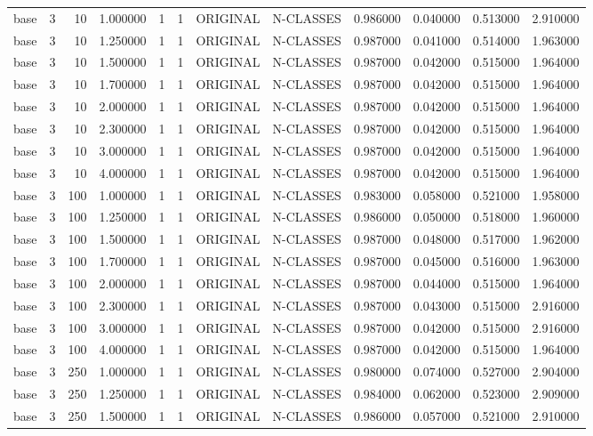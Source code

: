 \begin{tabular}{lrrrllllrrrr}
base & 3 & 10 & 1.000000 & 1 & 1 & ORIGINAL & N-CLASSES & 0.986000 & 0.040000 & 0.513000 & 2.910000 \\
base & 3 & 10 & 1.250000 & 1 & 1 & ORIGINAL & N-CLASSES & 0.987000 & 0.041000 & 0.514000 & 1.963000 \\
base & 3 & 10 & 1.500000 & 1 & 1 & ORIGINAL & N-CLASSES & 0.987000 & 0.042000 & 0.515000 & 1.964000 \\
base & 3 & 10 & 1.700000 & 1 & 1 & ORIGINAL & N-CLASSES & 0.987000 & 0.042000 & 0.515000 & 1.964000 \\
base & 3 & 10 & 2.000000 & 1 & 1 & ORIGINAL & N-CLASSES & 0.987000 & 0.042000 & 0.515000 & 1.964000 \\
base & 3 & 10 & 2.300000 & 1 & 1 & ORIGINAL & N-CLASSES & 0.987000 & 0.042000 & 0.515000 & 1.964000 \\
base & 3 & 10 & 3.000000 & 1 & 1 & ORIGINAL & N-CLASSES & 0.987000 & 0.042000 & 0.515000 & 1.964000 \\
base & 3 & 10 & 4.000000 & 1 & 1 & ORIGINAL & N-CLASSES & 0.987000 & 0.042000 & 0.515000 & 1.964000 \\
base & 3 & 100 & 1.000000 & 1 & 1 & ORIGINAL & N-CLASSES & 0.983000 & 0.058000 & 0.521000 & 1.958000 \\
base & 3 & 100 & 1.250000 & 1 & 1 & ORIGINAL & N-CLASSES & 0.986000 & 0.050000 & 0.518000 & 1.960000 \\
base & 3 & 100 & 1.500000 & 1 & 1 & ORIGINAL & N-CLASSES & 0.987000 & 0.048000 & 0.517000 & 1.962000 \\
base & 3 & 100 & 1.700000 & 1 & 1 & ORIGINAL & N-CLASSES & 0.987000 & 0.045000 & 0.516000 & 1.963000 \\
base & 3 & 100 & 2.000000 & 1 & 1 & ORIGINAL & N-CLASSES & 0.987000 & 0.044000 & 0.515000 & 1.964000 \\
base & 3 & 100 & 2.300000 & 1 & 1 & ORIGINAL & N-CLASSES & 0.987000 & 0.043000 & 0.515000 & 2.916000 \\
base & 3 & 100 & 3.000000 & 1 & 1 & ORIGINAL & N-CLASSES & 0.987000 & 0.042000 & 0.515000 & 2.916000 \\
base & 3 & 100 & 4.000000 & 1 & 1 & ORIGINAL & N-CLASSES & 0.987000 & 0.042000 & 0.515000 & 1.964000 \\
base & 3 & 250 & 1.000000 & 1 & 1 & ORIGINAL & N-CLASSES & 0.980000 & 0.074000 & 0.527000 & 2.904000 \\
base & 3 & 250 & 1.250000 & 1 & 1 & ORIGINAL & N-CLASSES & 0.984000 & 0.062000 & 0.523000 & 2.909000 \\
base & 3 & 250 & 1.500000 & 1 & 1 & ORIGINAL & N-CLASSES & 0.986000 & 0.057000 & 0.521000 & 2.910000 \\

\end{tabular}
